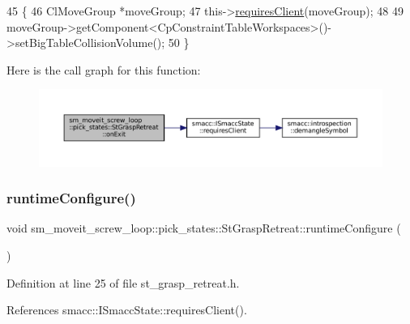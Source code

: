 \begin{DoxyCode}
45     \{
46         ClMoveGroup *moveGroup;
47         this->\hyperlink{classsmacc_1_1ISmaccState_a7f95c9f0a6ea2d6f18d1aec0519de4ac}{requiresClient}(moveGroup);
48         
49         moveGroup->getComponent<CpConstraintTableWorkspaces>()->setBigTableCollisionVolume();
50     \}
\end{DoxyCode}
Here is the call graph for this function\+:
\nopagebreak
\begin{figure}[H]
\begin{center}
\leavevmode
\includegraphics[width=350pt]{structsm__moveit__screw__loop_1_1pick__states_1_1StGraspRetreat_a8ce5ee5a1281a831a2b93966b022d83f_cgraph}
\end{center}
\end{figure}
\mbox{\label{structsm__moveit__screw__loop_1_1pick__states_1_1StGraspRetreat_adef9788db110e34f972fd4dddf4a4cff}} 
\subsubsection{\texorpdfstring{runtime\+Configure()}{runtimeConfigure()}}
{\footnotesize\ttfamily void sm\+\_\+moveit\+\_\+screw\+\_\+loop\+::pick\+\_\+states\+::\+St\+Grasp\+Retreat\+::runtime\+Configure (\begin{DoxyParamCaption}{ }\end{DoxyParamCaption})\hspace{0.3cm}{\ttfamily [inline]}}



Definition at line 25 of file st\+\_\+grasp\+\_\+retreat.\+h.



References smacc\+::\+I\+Smacc\+State\+::requires\+Client().


